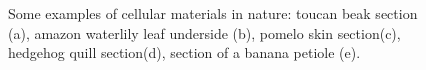 \begin{figure}
{    }
    \qquad
    \qquad
    \caption[Cellular materials in nature]{Some examples of cellular materials in nature: toucan beak section (a), amazon waterlily leaf underside (b), pomelo skin section(c), hedgehog quill section(d), section of a banana petiole (e)\cite{mcnulty_framework_2017}.}
    \label{fig:cellstruct}
\end{figure}
